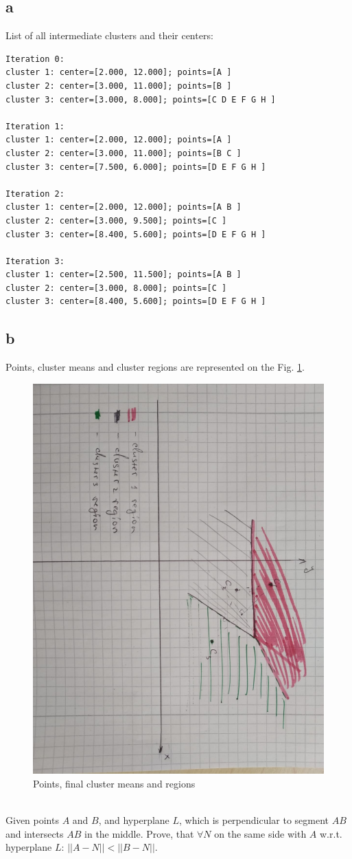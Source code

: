 \subsection*{a}
List of all intermediate clusters and their centers:
\begin{verbatim}
Iteration 0:
cluster 1: center=[2.000, 12.000]; points=[A ]
cluster 2: center=[3.000, 11.000]; points=[B ]
cluster 3: center=[3.000, 8.000]; points=[C D E F G H ]

Iteration 1:
cluster 1: center=[2.000, 12.000]; points=[A ]
cluster 2: center=[3.000, 11.000]; points=[B C ]
cluster 3: center=[7.500, 6.000]; points=[D E F G H ]

Iteration 2:
cluster 1: center=[2.000, 12.000]; points=[A B ]
cluster 2: center=[3.000, 9.500]; points=[C ]
cluster 3: center=[8.400, 5.600]; points=[D E F G H ]

Iteration 3:
cluster 1: center=[2.500, 11.500]; points=[A B ]
cluster 2: center=[3.000, 8.000]; points=[C ]
cluster 3: center=[8.400, 5.600]; points=[D E F G H ]
\end{verbatim}
\newpage
\subsection*{b}
Points, cluster means and cluster regions are represented on the Fig. \ref{fig:drawing}.
\begin{figure}[h!]
	\centering
	\includegraphics[width=0.5\linewidth, angle=90]{task4b.jpeg}
	\caption{Points, final cluster means and regions}
	\label{fig:drawing}
\end{figure}
\\
Given points $A$ and $B$, and hyperplane $L$, which is perpendicular to segment $AB$ and intersects $AB$ in the middle. Prove, that $\forall N$ on the same side with $A$ w.r.t. hyperplane $L$: $||A-N|| < ||B-N||$.

